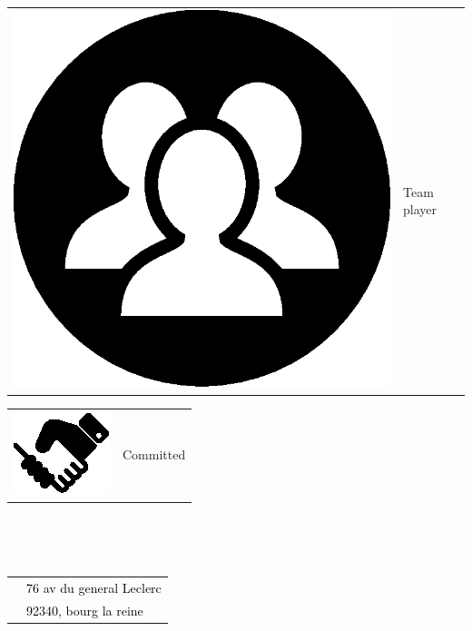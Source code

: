 \documentclass[letterpaper]{article}
\begin{document}
\begin{minipage}[t]{1\linewidth}
\begin{minipage}[t]{0.5\linewidth}
\begin{minipage}{1\linewidth}
\begin{minipage}{0.49\linewidth}
\begin{tabularx}{1\textwidth}{rX}
			\end{tabularx}
		\end{minipage}	
		\begin{minipage}{0.49\linewidth}
		\centering
			\begin{tabularx}{1\textwidth}{rX}		
				 \includegraphics[width=0.12\linewidth]{group.eps} & Team player
			\end{tabularx}
		\end{minipage}				
		\begin{minipage}{0.49\linewidth}
		 	\centering
			\begin{tabularx}{1\textwidth}{rX}
				\includegraphics[width=0.12\linewidth]{handshake.eps} & 
				Committed
			\end{tabularx}
		\end{minipage}\\
		\vspace{2ex}
	\end{minipage}
	\begin{minipage}{1\linewidth}
		\\
		\vspace{2ex}
		\begin{minipage}{1\linewidth}
			\begin{tabularx}{1\textwidth}{rX}
				\faEnvelopeAlt & \textcolor{black}{76 av du general 
				Leclerc}\\
				\vspace{1ex}
				& \textcolor{black}{92340, bourg la reine}\\
				

\end{tabularx}
\end{minipage}
\end{minipage}
\end{minipage}
\end{minipage}
\end{document}
